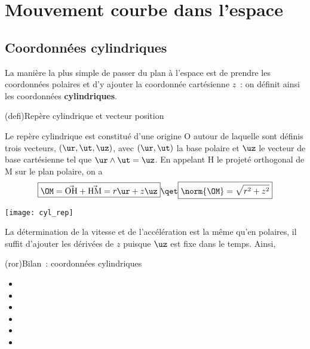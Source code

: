 \documentclass[../../main/main.tex]{subfiles}
\begin{document}
\section{Mouvement courbe dans l'espace}
\subsection{Coordonnées cylindriques}

La manière la plus simple de passer du plan à l'espace est de prendre les
coordonnées polaires et d'y ajouter la coordonnée cartésienne $z$~: on définit
ainsi les coordonnées \textbf{cylindriques}.

\begin{tcb*}(defi){Repère cylindrique et vecteur position}
	\begin{minipage}{0.70\linewidth}
		Le repère cylindrique est constitué d'une origine O autour de laquelle sont
		définis trois vecteurs, $(\ur,\ut,\uz)$, avec $(\ur,\ut)$ la base polaire et
		$\uz$ le vecteur de base cartésienne tel que $\ur \wedge \ut = \uz$. En
		appelant H le projeté orthogonal de M sur le plan polaire, on a
		\[
			\boxed{\OM = \vec{\rm OH} + \vec{\rm HM} = r\ur + z\uz}
			\qet
			\boxed{\norm{\OM} = \sqrt{r^2 + z^2}}
		\]
	\end{minipage}
	\hfill
	\begin{minipage}{0.25\linewidth}
		\begin{center}
			\texttt{[image: cyl\_rep]}
		\end{center}
	\end{minipage}
\end{tcb*}

La détermination de la vitesse et de l'accélération est la même qu'en polaires,
il suffit d'ajouter les dérivées de $z$ puisque $\uz$ est fixe dans le temps.
Ainsi,

\begin{tcb*}(ror){Bilan~: coordonnées cylindriques}
	\begin{itemize}
		\item {}
		\item {}
		\item {}
		\item {}
		\item {}
		\item {}
	\end{itemize}
\end{tcb*}
\end{document}
